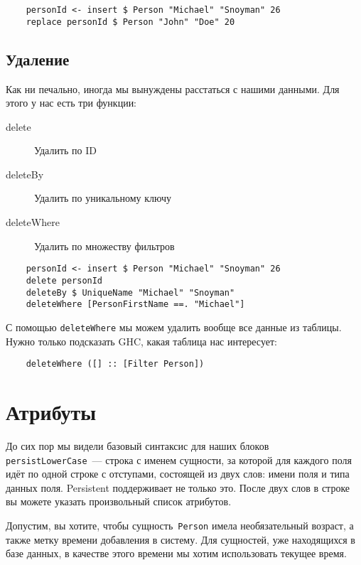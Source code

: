 \begin{lstlisting}
    personId <- insert $ Person "Michael" "Snoyman" 26
    replace personId $ Person "John" "Doe" 20
\end{lstlisting}

\subsection{Удаление}

Как ни печально, иногда мы вынуждены расстаться с нашими данными. Для этого у
нас есть три функции:
\begin{description}
    \item[delete] Удалить по ID

    \item[deleteBy] Удалить по уникальному ключу

    \item[deleteWhere] Удалить по множеству фильтров
\end{description}

\begin{lstlisting}
    personId <- insert $ Person "Michael" "Snoyman" 26
    delete personId
    deleteBy $ UniqueName "Michael" "Snoyman"
    deleteWhere [PersonFirstName ==. "Michael"]
\end{lstlisting}

С помощью \lstinline'deleteWhere' мы можем удалить вообще все данные из
таблицы. Нужно только подсказать GHC, какая таблица нас интересует:

\begin{lstlisting}
    deleteWhere ([] :: [Filter Person])
\end{lstlisting}

\section{Атрибуты}

До сих пор мы видели базовый синтаксис для наших блоков
\lstinline'persistLowerCase'~--- строка с именем сущности, за которой для
каждого поля идёт по одной строке с отступами, состоящей из двух слов: имени
поля и типа данных поля. Persistent поддерживает не только это. После двух слов
в строке вы можете указать произвольный список атрибутов.

Допустим, вы хотите, чтобы сущность~\lstinline'Person' имела необязательный
возраст, а также метку времени добавления в систему. Для сущностей, уже
находящихся в базе данных, в качестве этого времени мы хотим использовать
текущее время.

